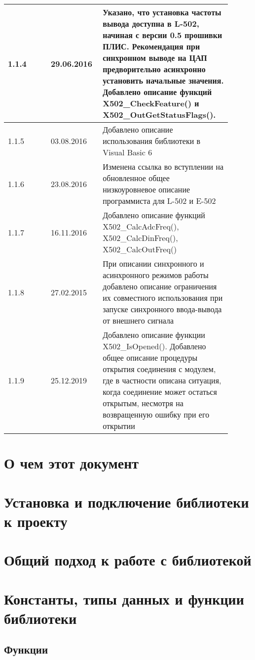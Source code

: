 \documentclass[12pt,a4paper,titlepage]{report}
\begin{document}
\begin{longtable}{|m{0.18\linewidth}|m{0.18\linewidth}|m{0.54\linewidth}|}
  1.1.4            & 29.06.2016    & Указано, что установка частоты вывода доступна в L-502, начиная с версии 0.5 прошивки ПЛИС. Рекомендация при синхронном выводе на ЦАП предворительно асинхронно установить начальные значения. Добавлено описание функций X502\_CheckFeature() и X502\_OutGetStatusFlags(). \\\hline
  1.1.5            & 03.08.2016    & Добавлено описание использования библиотеки в Visual Basic 6 \\\hline
  1.1.6            & 23.08.2016    & Изменена ссылка во вступлении на обновленное общее низкоуровневое описание программиста для L-502 и E-502 \\\hline
  1.1.7            & 16.11.2016    & Добавлено описание функций X502\_CalcAdcFreq(), X502\_CalcDinFreq(), X502\_CalcOutFreq() \\\hline
  1.1.8            & 27.02.2015    & При описании синхронного и асинхронного режимов работы добавлено описание ограничения их совместного использования при запуске синхронного ввода-вывода от внешнего сигнала \\\hline
  1.1.9            & 25.12.2019    & Добавлено описание функции X502\_IsOpened(). Добавлено общее описание процедуры открытия соединения с модулем, где в частности описана ситуация, когда соединение может остаться открытым, несмотря на возвращенную ошибку при его открытии \\\hline
  \end{longtable}
  \newpage  
  
  \tableofcontents
  

\chapter{О чем этот документ}

\chapter{Установка и подключение библиотеки к проекту}

\chapter{Общий подход к работе с библиотекой}


  
\chapter{Константы, типы данных и функции библиотеки}



%
%
%
\section{Функции}











\end{document}
